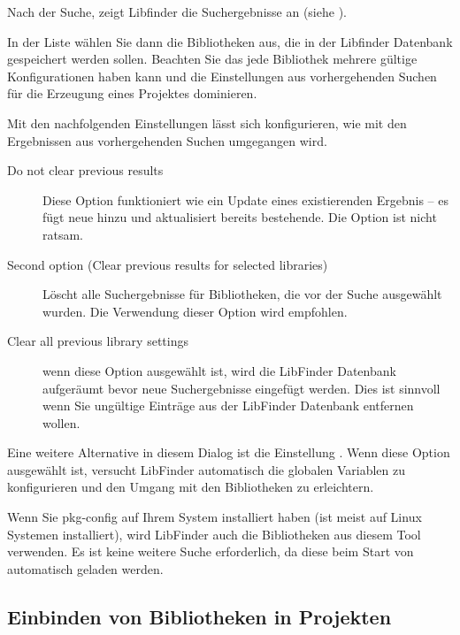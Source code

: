 
Nach der Suche, zeigt Libfinder die Suchergebnisse an (siehe ).


In der Liste wählen Sie dann die Bibliotheken aus, die in der Libfinder Datenbank gespeichert werden sollen. Beachten Sie das jede Bibliothek mehrere gültige Konfigurationen haben kann und die Einstellungen aus vorhergehenden Suchen für die Erzeugung eines Projektes dominieren.

Mit den nachfolgenden Einstellungen lässt sich konfigurieren, wie mit den Ergebnissen aus vorhergehenden Suchen umgegangen wird.

\begin{description}
\item[Do not clear previous results] Diese Option funktioniert wie ein Update eines existierenden Ergebnis -- es fügt neue hinzu und aktualisiert bereits bestehende. Die Option ist nicht ratsam.
\item[Second option (Clear previous results for selected libraries)] Löscht alle Suchergebnisse für Bibliotheken, die vor der Suche ausgewählt wurden. Die Verwendung dieser Option wird empfohlen.
\item[Clear all previous library settings] wenn diese Option ausgewählt ist, wird die LibFinder Datenbank aufgeräumt bevor neue Suchergebnisse eingefügt werden. Dies ist sinnvoll wenn Sie ungültige Einträge aus der LibFinder Datenbank entfernen wollen.
\end{description}

Eine weitere Alternative in diesem Dialog ist die Einstellung . Wenn diese Option ausgewählt ist, versucht LibFinder automatisch die globalen Variablen zu konfigurieren und den Umgang mit den Bibliotheken zu erleichtern.

Wenn Sie pkg-config auf Ihrem System installiert haben (ist meist auf Linux Systemen installiert), wird LibFinder auch die Bibliotheken aus diesem Tool verwenden. Es ist keine weitere Suche erforderlich, da diese beim Start von \codeblocks automatisch geladen werden.

\subsection{Einbinden von Bibliotheken in Projekten}

